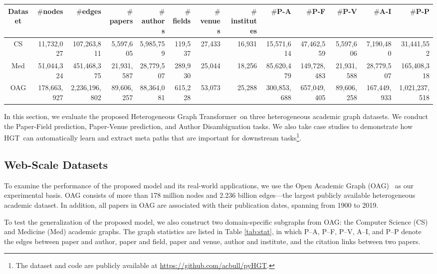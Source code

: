 \documentclass[sigconf]{acmart}
\theoremstyle{definition}
\newcommand{\model}{Heterogeneous Graph Transformer}
\newcommand{\short}{HGT}
\begin{document}
\begin{table*}[th]
\centering
\footnotesize
\begin{tabular}{c|rr|rrrrr|rrrrr} 
\toprule
Dataset & $\#$nodes & $\#$edges & $\#$papers & $\#$authors & $\#$fields & $\#$venues & $\#$institutes & $\#$P-A & $\#$P-F & $\#$P-V & $\#$A-I & $\#$P-P \\ 
\midrule
CS & 11,732,027 & 107,263,811 & 5,597,605 & 5,985,759 &  119,537&  27,433 & 16,931   & 15,571,614 & 47,462,559 & 5,597,606 & 7,190,480 & 31,441,552\\ 
\midrule
Med & 51,044,324 & 451,468,375 & 21,931,587 & 28,779,507&  289,930 &  25,044&  18,256  &85,620,479 & 149,728,483&21,931,588 & 28,779,507& 165,408,318\\ 
\midrule
OAG & 178,663,927 & 2,236,196,802  & 89,606,257 & 88,364,081 &  615,228&  53,073&  25,288 & 300,853,688&  657,049,405&  89,606,258&  167,449,933 & 1,021,237,518\\
\bottomrule
\end{tabular}
\caption{Open Academic Graph (OAG) Statistics.} 
\label{tab:stat} 
\end{table*}








In this section, we evaluate the proposed \model\ on three heterogeneous academic graph datasets. 
We conduct the Paper-Field prediction, Paper-Venue prediction, and Author Disambiguation tasks. 
We also take case studies to demonstrate how \short\ can automatically learn and extract meta paths that are important for downstream tasks\footnote{The dataset and code are publicly available at \url{https://github.com/acbull/pyHGT}.}. 


\subsection{Web-Scale Datasets}

To examine the performance of the proposed model and its real-world applications, we use the Open Academic Graph (OAG)~\cite{DBLP:conf/www/SinhaSSMEHW15,tang2008arnetminer,DBLP:conf/kdd/ZhangLTDYZGWSLW19} as our experimental basis. 
OAG consists of more than 178 million nodes and 2.236 billion edges---the largest publicly available heterogeneous academic dataset. 
In addition, all papers in OAG are associated with their publication dates, spanning from 1900 to 2019. 

To test the generalization of the proposed model, we also construct two domain-specific subgraphs from OAG: the Computer Science (CS) and Medicine (Med) academic graphs. 
The graph statistics are listed in Table \ref{tab:stat}, in which P--A, P--F, P--V, A--I, and P--P denote the edges between paper and author, paper and field, paper and venue, author and institute, and the citation links between two papers. 
\end{document}
